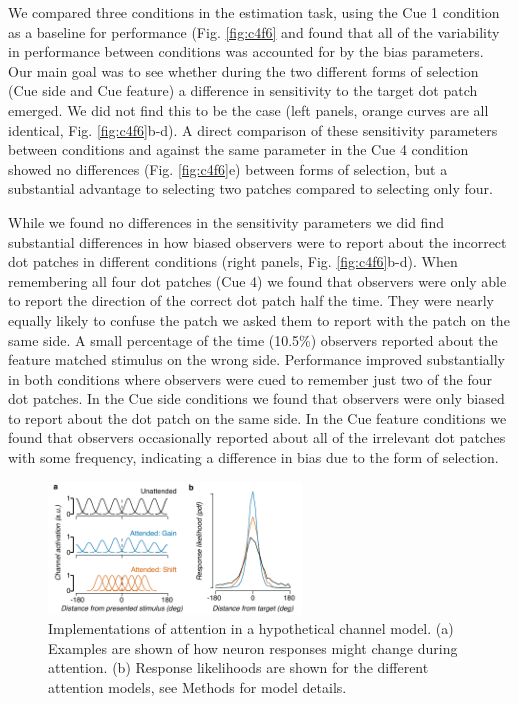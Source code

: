We compared three conditions in the estimation task, using the Cue 1 condition as a baseline for performance (Fig. \ref{fig:c4f6} and found that all of the variability in performance between conditions was accounted for by the bias parameters. Our main goal was to see whether during the two different forms of selection (Cue side and Cue feature) a difference in sensitivity to the target dot patch emerged. We did not find this to be the case (left panels, orange curves are all identical, Fig. \ref{fig:c4f6}b-d). A direct comparison of these sensitivity parameters between conditions and against the same parameter in the Cue 4 condition showed no differences (Fig. \ref{fig:c4f6}e) between forms of selection, but a substantial advantage to selecting two patches compared to selecting only four. 

While we found no differences in the sensitivity parameters we did find substantial differences in how biased observers were to report about the incorrect dot patches in different conditions (right panels, Fig. \ref{fig:c4f6}b-d). When remembering all four dot patches (Cue 4) we found that observers were only able to report the direction of the correct dot patch half the time. They were nearly equally likely to confuse the patch we asked them to report with the patch on the same side. A small percentage of the time (10.5\%) observers reported about the feature matched stimulus on the wrong side. Performance improved substantially in both conditions where observers were cued to remember just two of the four dot patches. In the Cue side conditions we found that observers were only biased to report about the dot patch on the same side. In the Cue feature conditions we found that observers occasionally reported about all of the irrelevant dot patches with some frequency, indicating a difference in bias due to the form of selection. 

\begin{figure}
\centering
\includegraphics[keepaspectratio,width=0.6\textwidth]{figs_c4/f5_channel_attention.pdf}
\caption[Attention in a channel model]{Implementations of attention in a hypothetical channel model. (a) Examples are shown of how neuron responses might change during attention. (b) Response likelihoods are shown for the different attention models, see Methods for model details.}
\label{fig:c4f7}
\end{figure}

